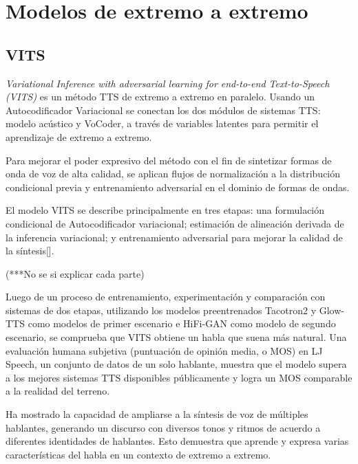 \section{Modelos de extremo a extremo}
\subsection{VITS}

\textit{Variational Inference with adversarial learning for end-to-end Text-to-Speech (VITS)} es un método TTS de extremo a extremo en paralelo. Usando un Autocodificador Variacional se conectan los dos módulos de sistemas TTS: modelo acústico y VoCoder, a través de variables latentes para permitir el aprendizaje de extremo a extremo. 

Para mejorar el poder expresivo del método con el fin de sintetizar formas de onda de voz de alta calidad, se aplican flujos de normalización a la distribución condicional previa y entrenamiento adversarial en el dominio de formas de ondas.

El modelo VITS se describe principalmente en tres etapas: una formulación condicional de Autocodificador variacional; estimación de alineación derivada de la inferencia variacional; y entrenamiento adversarial para mejorar la calidad de la síntesis[\cite{kim2021conditional}].

(***No se si explicar cada parte)



Luego de un proceso de entrenamiento, experimentación y comparación con sistemas de dos etapas, utilizando los modelos preentrenados Tacotron2 y Glow-TTS como modelos de primer escenario e HiFi-GAN como modelo de segundo escenario, se comprueba que VITS obtiene un habla que suena más natural. Una evaluación humana subjetiva (puntuación de opinión media, o MOS) en LJ Speech, un conjunto de datos de un solo hablante, muestra que el modelo supera a los mejores sistemas TTS disponibles públicamente y logra un MOS comparable a la realidad del terreno.

Ha mostrado la capacidad de ampliarse a la síntesis de voz de múltiples hablantes, generando un discurso con diversos tonos y ritmos de acuerdo a diferentes identidades de hablantes. Esto demuestra que aprende y expresa varias características del habla en un contexto de extremo a extremo.




